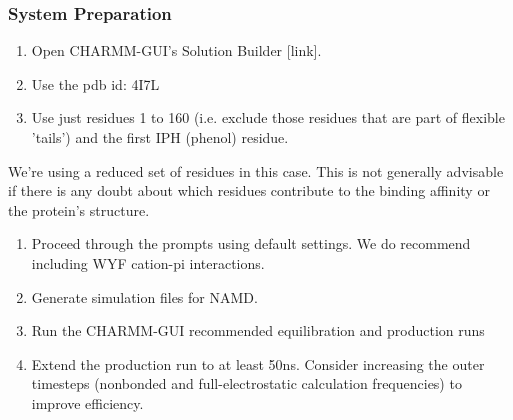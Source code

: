 \documentclass[9pt,tutorial]{Styling/livecoms}
\begin{document}
\subsubsection{System Preparation}
\begin{enumerate}
    \item Open CHARMM-GUI's Solution Builder [link].
    \item Use the pdb id: 4I7L
    \item Use just residues 1 to 160 (i.e. exclude those residues that are part of flexible 'tails') and the first IPH (phenol) residue.
\end{enumerate}
\begin{tcolorbox}[colback=blue!5!white,colframe=blue!75!black]
  We're using a reduced set of residues in this case. This is not generally advisable if there is any doubt about which residues contribute to the binding affinity or the protein's structure.
\end{tcolorbox}
\begin{enumerate}[resume]
    \item Proceed through the prompts using default settings. We do recommend including WYF cation-pi interactions.
    \item Generate simulation files for NAMD.
    \item Run the CHARMM-GUI recommended equilibration and production runs
    \item Extend the production run to at least 50ns. Consider increasing the outer timesteps (nonbonded and full-electrostatic calculation frequencies) to improve efficiency.
\end{enumerate}
\end{document}

